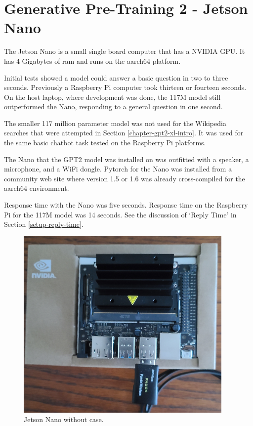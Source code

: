 \label{chapter-xlarge}

\section{Generative Pre-Training 2 - Jetson Nano}

\label{chapter-nano}
The Jetson Nano is a small single board computer that has a NVIDIA GPU. It has 4 Gigabytes of ram and runs on the aarch64 platform.

Initial tests showed a model could answer a basic question in two to three seconds. Previously a Raspberry Pi computer took thirteen or fourteen seconds. On the host laptop, where development was done, the 117M model still outperformed the Nano, responding to a general question in one second.

The smaller 117 million parameter model was not used for the Wikipedia searches that were attempted in Section \ref{chapter-gpt2-xl-intro}. It was used for the same basic chatbot task tested on the Raspberry Pi platforms.


The Nano that the GPT2 model was installed on was outfitted with a speaker, a microphone, and a WiFi dongle. Pytorch for the Nano was installed from a community web site where version 1.5 or 1.6 was already cross-compiled for the aarch64 environment. 

Response time with the Nano was five seconds. Response time on the Raspberry Pi for the 117M model was 14 seconds. See the discussion of `Reply Time' in Section \ref{setup-reply-time}.

\begin{figure}[H]
	\begin{center}
		\includegraphics[scale=0.9]{diagram-jetson-nano-02}
		
		
	\end{center}
	\caption[Jetson Nano]{Jetson Nano without case.}
	
	
\end{figure}